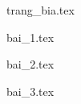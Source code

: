 \documentclass[12pt, a4paper, fleqn]{article}
\begin{document}
    \thispagestyle{empty}
	
	{trang_bia.tex}

	\begin{center}
	    \tableofcontents
	\end{center}
	\clearpage
	
	
    {bai_1.tex}
	
	{bai_2.tex}
	
	{bai_3.tex}
\end{document}

